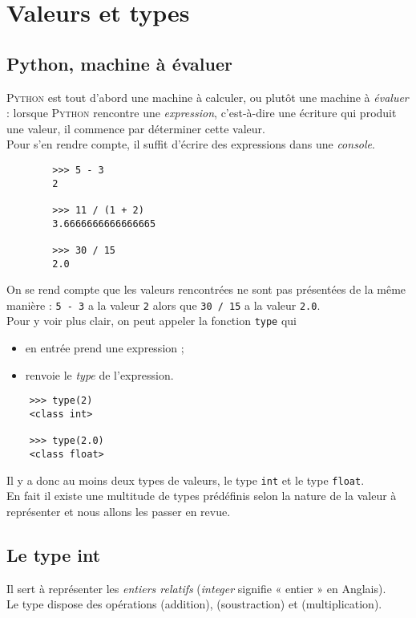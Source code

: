 \chapter{Valeurs et types}
\section{Python, machine à évaluer}
\textsc{Python} est tout d'abord une machine à calculer, ou plutôt une machine à \textit{évaluer} : lorsque \textsc{Python} rencontre une \textit{expression}, c'est-à-dire une écriture qui produit une valeur, il commence par déterminer cette valeur.\\
Pour s'en rendre compte, il suffit d'écrire des expressions dans une \textit{console}.
\begin{pyc}
    \begin{verbatim}
        >>> 5 - 3
        2
        
        >>> 11 / (1 + 2)
        3.6666666666666665

        >>> 30 / 15
        2.0
    \end{verbatim}
\end{pyc}
On se rend compte que les valeurs rencontrées ne sont pas présentées de la même manière : \texttt{5 - 3} a la valeur \texttt{2} alors que \texttt{30 / 15} a la valeur \texttt{2.0}.\\
Pour y voir plus clair, on peut appeler la fonction \texttt{type} qui 
\begin{itemize}
  \item en entrée prend une expression ;
  \item renvoie le \textit{type} de l'expression.
\end{itemize}
\begin{pyc}
  \begin{verbatim}
    >>> type(2)
    <class int>

    >>> type(2.0)
    <class float>
  \end{verbatim}
\end{pyc}

Il y a donc au moins deux types de valeurs, le type \texttt{int} et le type \texttt{float}.\\
En fait il existe une multitude de types prédéfinis selon la nature de la valeur à représenter et nous allons les passer en revue.


\section{Le type int}
Il sert à représenter les \textit{entiers relatifs} (\textit{integer} signifie  « entier » en Anglais).\\
Le type  dispose des opérations \pythoninline{+} (addition), \pythoninline{-} (soustraction) et \pythoninline{*} (multiplication).

